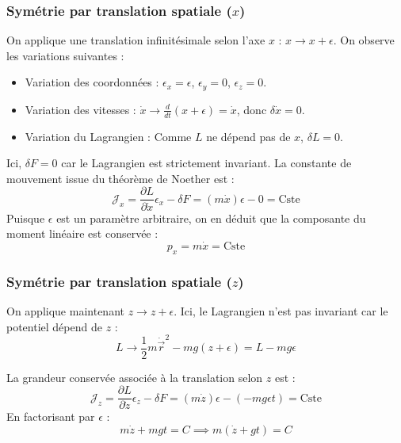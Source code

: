 \documentclass[french]{yLectureNote}
\renewcommand{\vec}{\overrightarrow}
\begin{document}
\subsubsection{Symétrie par translation spatiale ($x$)}

On applique une translation infinitésimale selon l'axe $x$ : $x \to x + \epsilon$.
On observe les variations suivantes :
\begin{itemize}
    \item Variation des coordonnées : $\epsilon_x = \epsilon$, $\epsilon_y = 0$, $\epsilon_z = 0$.
    \item Variation des vitesses : $\dot{x} \to \frac{d}{dt}(x+\epsilon) = \dot{x}$, donc $\delta \dot{x} = 0$.
    \item Variation du Lagrangien : Comme $L$ ne dépend pas de $x$, $\delta L = 0$.
\end{itemize}


Ici, $\delta F = 0$ car le Lagrangien est strictement invariant. La constante de mouvement issue du théorème de Noether est :
$$\mathcal{J}_x = \frac{\partial L}{\partial \dot{x}}\epsilon_x - \delta F = (m\dot{x})\epsilon - 0 = \text{Cste}$$
Puisque $\epsilon$ est un paramètre arbitraire, on en déduit que la composante du moment linéaire est conservée :
$$\boxed{p_x = m\dot{x} = \text{Cste}}$$


\subsubsection{Symétrie par translation spatiale ($z$)}

On applique maintenant $z \to z + \epsilon$. 
Ici, le Lagrangien n'est pas invariant car le potentiel dépend de $z$ :
$$L \to \frac{1}{2}m\dot{\vec{r}}^2 - mg(z+\epsilon) = L - mg\epsilon$$



La grandeur conservée associée à la translation selon $z$ est :
$$\mathcal{J}_z = \frac{\partial L}{\partial \dot{z}}\epsilon_z - \delta F = (m\dot{z})\epsilon - (-mg\epsilon t) = \text{Cste}$$
En factorisant par $\epsilon$ :
$$m\dot{z} + mgt = C \implies m(\dot{z} + gt) = C$$


\end{document}
